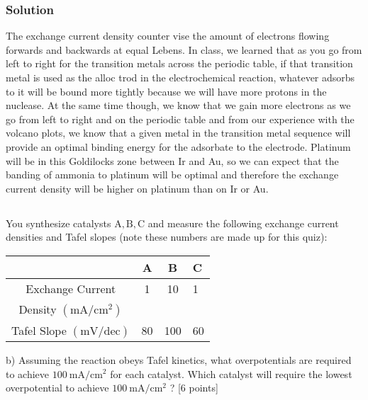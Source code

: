 \documentclass[12pt]{article}
\begin{document}
\subsubsection{Solution}
The exchange current density counter vise the amount of electrons flowing forwards and backwards at equal Lebens. In class, we learned that as you go from left to right for the transition metals across the periodic table, if that transition metal is used as the alloc trod in the electrochemical reaction, whatever adsorbs to it will be bound more tightly because we will have more protons in the nuclease. At the same time though, we know that we gain more electrons as we go from left to right and on the periodic table and from our experience with the volcano plots, we know that a given metal in the transition metal sequence will provide an optimal binding energy for the adsorbate to the electrode. Platinum will be in this Goldilocks zone between Ir and Au, so we can expect that the banding of ammonia to platinum will be optimal and therefore the exchange current density will be higher on platinum than on Ir or Au.
\subsection{}

You synthesize catalysts $\mathrm{A}, \mathrm{B}, \mathrm{C}$ and measure the following exchange current densities and Tafel slopes (note these numbers are made up for this quiz):

\begin{center}
\begin{tabular}{c|ccl}
 & A & B & C \\
\hline
Exchange Current & 1 & 10 & 1 \\
Density $\left(\mathrm{mA} / \mathrm{cm}^{2}\right)$ &  &  &  \\
\hline
Tafel Slope $(\mathrm{mV} / \mathrm{dec})$ & 80 & 100 & 60 \\
\hline
\end{tabular}
\end{center}

b) Assuming the reaction obeys Tafel kinetics, what overpotentials are required to achieve $100 \mathrm{~mA} / \mathrm{cm}^{2}$ for each catalyst. Which catalyst will require the lowest overpotential to achieve $100 \mathrm{~mA} / \mathrm{cm}^{2}$ ? [6 points]\\
\end{document}
